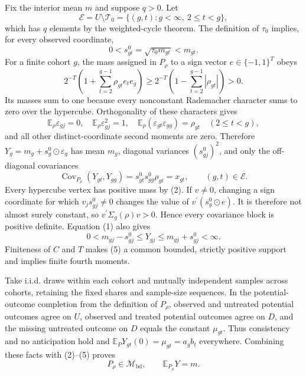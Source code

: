 Fix the interior mean \(m\) and suppose \(q>0\).  Let
\[
\mathcal E=U\setminus\mathcal T_0
=\{(g,t):g<\infty,\ 2\le t<g\},
\]
which has \(q\) elements by the weighted-cycle theorem.  The definition of \(\tau_0\) implies, for every observed coordinate,
\[
0<s^0_{gt}=\sqrt{\tau_0m_{gt}}<m_{gt}.                                  \tag{1}
\]
For a finite cohort \(g\), the mass assigned in \(P_\rho\) to a sign vector \(e\in\{-1,1\}^T\) obeys
\[
2^{-T}\left(1+\sum_{t=2}^{g-1}\rho_{gt}e_te_g\right)
\ge 2^{-T}\left(1-\sum_{t=2}^{g-1}|\rho_{gt}|\right)>0.               \tag{2}
\]
Its masses sum to one because every nonconstant Rademacher character sums to zero over the hypercube.  Orthogonality of these characters gives
\[
\mathbb E_\rho\varepsilon_{gj}=0,
\quad
\mathbb E_\rho\varepsilon_{gj}^2=1,
\quad
\mathbb E_\rho(\varepsilon_{gt}\varepsilon_{gg})=\rho_{gt}
\quad(2\le t<g),                                                        \tag{3}
\]
and all other distinct-coordinate second moments are zero.  Therefore
\(Y_g=m_g+s_g^0\odot\varepsilon_g\) has mean \(m_g\), diagonal variances \((s^0_{gj})^2\), and only the off-diagonal covariances
\[
\operatorname{Cov}_{P_\rho}(Y_{gt},Y_{gg})
=s^0_{gt}s^0_{gg}\rho_{gt}=x_{gt},
\qquad (g,t)\in\mathcal E.                                             \tag{4}
\]
Every hypercube vertex has positive mass by (2).  If \(v\ne0\), changing a sign coordinate for which \(v_js^0_{gj}\ne0\) changes the value of
\(v^{\prime}(s_g^0\odot e)\).  It is therefore not almost surely constant, so
\(v^{\prime}\Sigma_g(\rho)v>0\).  Hence every covariance block is positive definite.  Equation (1) also gives
\[
0<m_{gj}-s^0_{gj}\le Y_{gj}\le m_{gj}+s^0_{gj}<\infty.                 \tag{5}
\]
Finiteness of \(C\) and \(T\) makes (5) a common bounded, strictly positive support and implies finite fourth moments.

Take i.i.d. draws within each cohort and mutually independent samples across cohorts, retaining the fixed shares and sample-size sequences.  In the potential-outcome completion from the definition of \(P_\rho\), observed and untreated potential outcomes agree on \(U\), observed and treated potential outcomes agree on \(D\), and the missing untreated outcome on \(D\) equals the constant \(\mu_{gt}\).  Thus consistency and no anticipation hold and
\(\mathbb E_PY_{gt}(0)=\mu_{gt}=a_gb_t\) everywhere.  Combining these facts with (2)--(5) proves
\[
P_\rho\in\mathcal M_{\mathrm{bd}},
\qquad
\mathbb E_{P_\rho}Y=m.                                                   \tag{6}
\]

